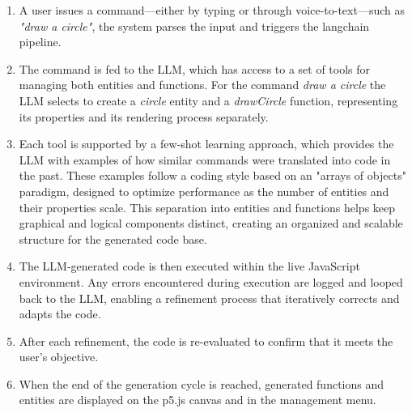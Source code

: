 \begin{enumerate}
    \item A user issues a command—either by typing or through voice-to-text—such as \emph{"draw a circle"}, the system parses the input and triggers the langchain pipeline.
    
    \item The command is fed to the LLM, which has access to a set of tools for managing both entities and functions.
    For the command \emph{draw a circle} the LLM selects to create a \textit{circle} entity and a \textit{drawCircle} function, representing its properties and its rendering process separately.
    
    \item Each tool is supported by a few-shot learning approach, which provides the LLM with examples of how similar commands were translated into code in the past.
    These examples follow a coding style based on an "arrays of objects" paradigm, designed to optimize performance as the number of entities and their properties scale.
    This separation into entities and functions helps keep graphical and logical components distinct, creating an organized and scalable structure for the generated code base.
    
    \item  The LLM-generated code is then executed within the live JavaScript environment.
    Any errors encountered during execution are logged and looped back to the LLM, enabling a refinement process that iteratively corrects and adapts the code.

    \item After each refinement, the code is re-evaluated to confirm that it meets the user’s objective.

    \item When the end of the generation cycle is reached, generated functions and entities are displayed on the p5.js canvas and in the management menu.

\end{enumerate}



